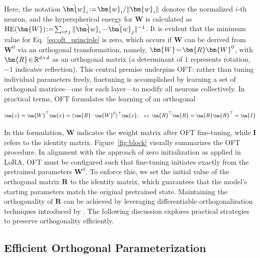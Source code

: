 Here, the notation $\thickmuskip=2mu \medmuskip=2mu \hat{\bm{w}}_i:=\bm{w}_i/\|\bm{w}_i\|$ denotes the normalized $i$-th neuron, and the hyperspherical energy for $\bm{W}$ is calculated as $\thickmuskip=2mu \medmuskip=2mu \text{HE}(\bm{W}):= \sum_{i\neq j} \|\hat{\bm{w}}_i-\hat{\bm{w}}_j\|^{-1}$. It is evident that the minimum value for Eq.~\eqref{eq:oft_principle} is zero, which occurs if $\bm{W}$ can be derived from $\bm{W}^0$ via an orthogonal transformation, namely, $\thickmuskip=2mu \medmuskip=2mu \bm{W}=\bm{R}\bm{W}^0$, with $\thickmuskip=2mu \medmuskip=2mu \bm{R}\in\mathbb{R}^{d\times d}$ as an orthogonal matrix (a determinant of $1$ represents rotation, $-1$ indicates reflection). This central premise underpins OFT: rather than tuning individual parameters freely, finetuning is accomplished by learning a set of orthogonal matrices—one for each layer—to modify all neurons collectively. In practical terms, OFT formulates the learning of an orthogonal

\begin{equation}\label{eq:oft_general}
    \footnotesize
    \bm{z} = \bm{W}^\top\bm{x} = (\bm{R}\cdot\bm{W}^0)^\top\bm{x},~~~\text{s.t.}~\bm{R}^\top\bm{R} = \bm{R}\bm{R}^\top = \bm{I}
\end{equation}

In this formulation, $\bm{W}$ indicates the weight matrix after OFT fine-tuning, while $\bm{I}$ refers to the identity matrix. Figure~\ref{fig:block} visually summarizes the OFT procedure. In alignment with the approach of zero initialization as applied in LoRA, OFT must be configured such that fine-tuning initiates exactly from the pretrained parameters $\bm{W}^0$. To enforce this, we set the initial value of the orthogonal matrix $\bm{R}$ to the identity matrix, which guarantees that the model's starting parameters match the original pretrained state. Maintaining the orthogonality of $\bm{R}$ can be achieved by leveraging differentiable orthogonalization techniques introduced by \cite{liu2021orthogonal,lezcano2019cheap}. The following discussion explores practical strategies to preserve orthogonality efficiently.

\subsection{Efficient Orthogonal Parameterization}\label{sect:eff_ortho}

